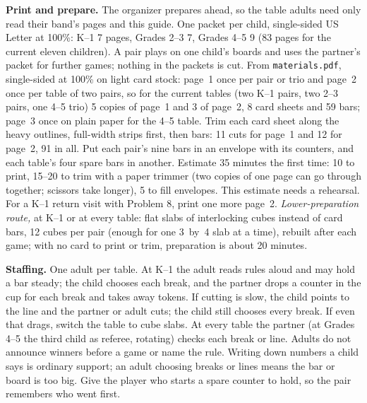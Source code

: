 \documentclass[11pt]{article}
\begin{document}
\textbf{Print and prepare.} The organizer prepares ahead, so the table adults need only read their band's pages and this guide. One packet per child, single-sided US Letter at 100\%: K--1 7 pages, Grades 2--3 7, Grades 4--5 9 (83 pages for the current eleven children). A pair plays on one child's boards and uses the partner's packet for further games; nothing in the packets is cut. From \texttt{materials.pdf}, single-sided at 100\% on light card stock: page~1 once per pair or trio and page~2 once per table of two pairs, so for the current tables (two K--1 pairs, two 2--3 pairs, one 4--5 trio) 5 copies of page~1 and 3 of page~2, 8 card sheets and 59 bars; page~3 once on plain paper for the 4--5 table. Trim each card sheet along the heavy outlines, full-width strips first, then bars: 11 cuts for page~1 and 12 for page~2, 91 in all. Put each pair's nine bars in an envelope with its counters, and each table's four spare bars in another. Estimate 35 minutes the first time: 10 to print, 15--20 to trim with a paper trimmer (two copies of one page can go through together; scissors take longer), 5 to fill envelopes. This estimate needs a rehearsal. For a K--1 return visit with Problem 8, print one more page~2. \emph{Lower-preparation route,} at K--1 or at every table: flat slabs of interlocking cubes instead of card bars, 12 cubes per pair (enough for one 3~by~4 slab at a time), rebuilt after each game; with no card to print or trim, preparation is about 20 minutes.

\textbf{Staffing.} One adult per table. At K--1 the adult reads rules aloud and may hold a bar steady; the child chooses each break, and the partner drops a counter in the cup for each break and takes away tokens. If cutting is slow, the child points to the line and the partner or adult cuts; the child still chooses every break. If even that drags, switch the table to cube slabs. At every table the partner (at Grades 4--5 the third child as referee, rotating) checks each break or line. Adults do not announce winners before a game or name the rule. Writing down numbers a child says is ordinary support; an adult choosing breaks or lines means the bar or board is too big. Give the player who starts a spare counter to hold, so the pair remembers who went first.
\end{document}
